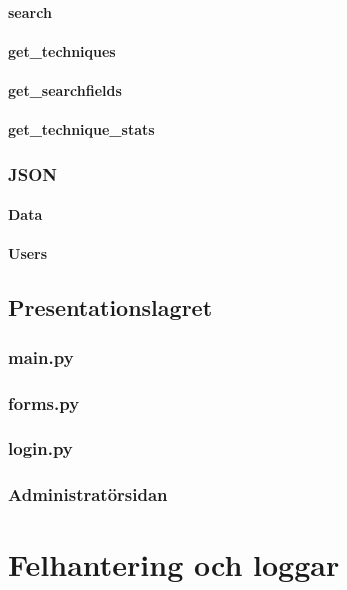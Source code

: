 \documentclass{TDP003mall}
\begin{document}
\paragraph{search}
\paragraph{get\_techniques}
\paragraph{get\_searchfields}
\paragraph{get\_technique\_stats}

\subsubsection{JSON}
\paragraph{Data}
\paragraph{Users}

\subsection{Presentationslagret}

\subsubsection{main.py}

\subsubsection{forms.py}

\subsubsection{login.py}

\subsubsection{Administratörsidan}

\section{Felhantering och loggar}
\end{document}
